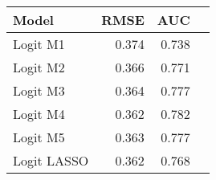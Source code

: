 \begin{tabular}{lrrr}
\toprule
Model  &  RMSE & AUC\\
\midrule
Logit M1 & 0.374 & 0.738\\
Logit M2 & 0.366 & 0.771\\
Logit M3 & 0.364 & 0.777\\
Logit M4 & 0.362 & 0.782\\
Logit M5 & 0.363 & 0.777\\
Logit LASSO & 0.362 & 0.768\\
\bottomrule
\end{tabular}

